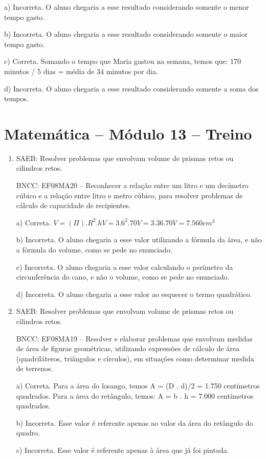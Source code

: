 \begin{enumerate}
a) Incorreta. O aluno chegaria a esse resultado considerando
somente o menor tempo gasto.

b) Incorreta. O aluno chegaria a esse resultado considerando
somente o maior tempo gasto.

c) Correta. Somando o tempo que Maria gastou na semana, temos que:
170 minutos / 5 dias = média de 34 minutos por dia.

d) Incorreta. O aluno chegaria a esse resultado considerando
somente a soma dos tempos.
\end{enumerate}


\section*{Matemática – Módulo 13 – Treino}
\begin{enumerate}
\item SAEB: Resolver problemas que envolvam volume de prismas retos ou
cilindros retos.

BNCC: EF08MA20 -- Reconhecer a relação entre um litro e um decímetro
cúbico e a relação entre litro e metro cúbico, para resolver problemas
de cálculo de capacidade de recipientes.

a) Correta.
$V = (\Pi) . R^2 .h
V = 3 . 6^2 . 70
V = 3 . 36 . 70
V = 7.560 cm^3$

b) Incorreta. O aluno chegaria a esse valor utilizando a fórmula da
área, e não a fórmula do volume, como se pede no enunciado.

c) Incorreta. O aluno chegaria a esse valor calculando o perímetro
da circunferência do cano, e não o volume, como se pede no enunciado.

d) Incorreta. O aluno chegaria a esse valor ao esquecer o termo
quadrático.
\item SAEB: Resolver problemas que envolvam volume de prismas retos ou
cilindros retos.

BNCC: EF08MA19 -- Resolver e elaborar problemas que envolvam medidas de
área de figuras geométricas, utilizando expressões de cálculo de área
(quadriláteros, triângulos e círculos), em situações como determinar
medida de terrenos.

a) Correta.
Para a área do losango, temos A = (D . d)/2 = 1.750 centímetros quadrados.
Para a área do retângulo, temos: A = b . h = 7.000 centímetros quadrados.

b) Incorreta. Esse valor é referente apenas ao valor da área do
retângulo do quadro.

c) Incorreta. Esse valor é referente apenas à área que já foi
pintada.


\end{enumerate}
